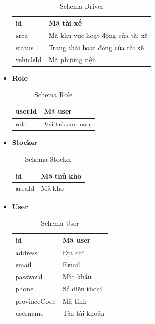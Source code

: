 \begin{itemize}
		\begin{table}[H]
			\centering\begin{tabular}{|l|m{30em}|}
				\hline 
				id & Mã tài xế\\
				\hline 
				area & Mã khu vực hoạt động của tài xế\\
				\hline 
				status & Trạng thái hoạt động của tài xế\\
				\hline 
				vehicleId & Mã phương tiện\\
				\hline 
			\end{tabular}
			\caption{Schema Driver}
		\end{table}
	
		\item \textbf{Role}
		
		\begin{table}[H]
			\centering\begin{tabular}{|l|m{30em}|}
				\hline 
				userId & Mã user\\
				\hline 
				role & Vai trò của user\\
				\hline 
			\end{tabular}
			\caption{Schema Role}
		\end{table}
	
		\item \textbf{Stocker}
		
		\begin{table}[H]
			\centering\begin{tabular}{|l|m{30em}|}
				\hline 
				id & Mã thủ kho\\
				\hline 
				areaId & Mã kho\\
				\hline 
			\end{tabular}
			\caption{Schema Stocker}
		\end{table}
	
		\item \textbf{User}
		
		\begin{table}[H]
			\centering\begin{tabular}{|l|m{30em}|}
				\hline 
				id & Mã user\\
				\hline 
				address & Địa chỉ\\
				\hline 
				email & Email\\
				\hline 
				password & Mật khẩu\\
				\hline 
				phone & Số điện thoại\\
				\hline 
				provinceCode & Mã tỉnh\\
				\hline 
				username & Tên tài khoản\\
				\hline 
			\end{tabular}
			\caption{Schema User}
		\end{table}
	

\end{itemize}
